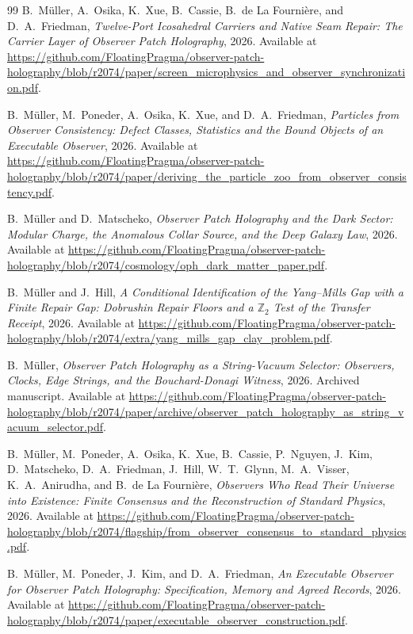 \begin{thebibliography}{99}
B.~M\"uller, A.~Osika, K.~Xue, B.~Cassie, B.~de La Fourni\`ere, and D.~A.~Friedman,
\emph{Twelve-Port Icosahedral Carriers and Native Seam Repair: The Carrier Layer of Observer Patch Holography},
2026.
Available at \url{https://github.com/FloatingPragma/observer-patch-holography/blob/r2074/paper/screen_microphysics_and_observer_synchronization.pdf}.

B.~M\"uller, M.~Poneder, A.~Osika, K.~Xue, and D.~A.~Friedman,
\emph{Particles from Observer Consistency: Defect Classes, Statistics and the Bound Objects of an Executable Observer},
2026.
Available at \url{https://github.com/FloatingPragma/observer-patch-holography/blob/r2074/paper/deriving_the_particle_zoo_from_observer_consistency.pdf}.

B.~M\"uller and D.~Matscheko,
\emph{Observer Patch Holography and the Dark Sector: Modular Charge,
the Anomalous Collar Source, and the Deep Galaxy Law},
2026.
Available at \url{https://github.com/FloatingPragma/observer-patch-holography/blob/r2074/cosmology/oph_dark_matter_paper.pdf}.

B.~M\"uller and J.~Hill,
\emph{A Conditional Identification of the Yang--Mills Gap with a Finite Repair Gap: Dobrushin Repair Floors and a \(\mathbb Z_2\) Test of the Transfer Receipt},
2026.
Available at \url{https://github.com/FloatingPragma/observer-patch-holography/blob/r2074/extra/yang_mills_gap_clay_problem.pdf}.

B.~M\"uller,
\emph{Observer Patch Holography as a String-Vacuum Selector: Observers, Clocks, Edge Strings, and the Bouchard-Donagi Witness},
2026. Archived manuscript.
Available at \url{https://github.com/FloatingPragma/observer-patch-holography/blob/r2074/paper/archive/observer_patch_holography_as_string_vacuum_selector.pdf}.

B.~M\"uller, M.~Poneder, A.~Osika, K.~Xue, B.~Cassie, P.~Nguyen, J.~Kim, D.~Matscheko, D.~A.~Friedman, J.~Hill, W.~T.~Glynn, M.~A.~Visser, K.~A.~Anirudha, and B.~de La Fourni\`ere,
\emph{Observers Who Read Their Universe into Existence: Finite Consensus and the Reconstruction of Standard Physics},
2026.
Available at \url{https://github.com/FloatingPragma/observer-patch-holography/blob/r2074/flagship/from_observer_consensus_to_standard_physics.pdf}.

B.~M\"uller, M.~Poneder, J.~Kim, and D.~A.~Friedman,
\emph{An Executable Observer for Observer Patch Holography: Specification, Memory and Agreed Records},
2026.
Available at \url{https://github.com/FloatingPragma/observer-patch-holography/blob/r2074/paper/executable_observer_construction.pdf}.


\end{thebibliography}
